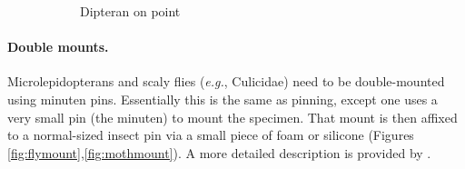 \documentclass[letterpaper, 11pt]{article}
\begin{document}
\begin{figure}[ht!]
\begin{subfigure}[ht!]{0.38\textwidth}
        \caption{Dipteran on point \citep[][Fig. 24]{USDAmanual1986}}
        \label{fig:flypoint}
    \end{subfigure}
    \caption{}
\end{figure}

\paragraph*{Double mounts.} Microlepidopterans and scaly flies (\textit{e.g.}, Culicidae) need to be double-mounted using minuten pins. Essentially this is the same as pinning, except one uses a very small pin (the minuten) to mount the specimen. That mount is then affixed to a normal-sized insect pin via a small piece of foam or silicone  (Figures \ref{fig:flymount},\ref{fig:mothmount}). A more detailed description is provided by \cite{GrinterWebpage}.
\end{document}
